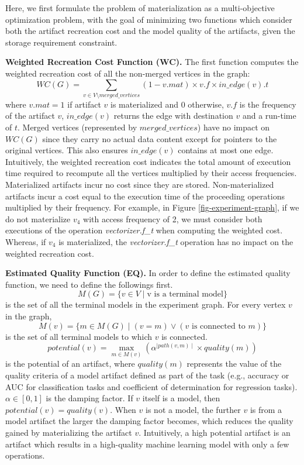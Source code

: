 Here, we first formulate the problem of materialization as a multi-objective optimization problem, with the goal of minimizing two functions which consider both the artifact recreation cost and the model quality of the artifacts, given the storage requirement constraint.

\textbf{Weighted Recreation Cost Function (WC).} 
The first function computes the weighted recreation cost of all the non-merged vertices in the graph:
\[
WC(G) =  \sum\limits_{v \in V\setminus merged\_vertices}  (1-v.mat) \times v.f \times in\_edge(v).t
\]
where $v.mat = 1$ if artifact $v$ is materialized and $0$ otherwise, $v.f$ is the frequency of the artifact $v$, $in\_edge(v)$ returns the edge with destination $v$ and a run-time of $t$.
Merged vertices (represented by $merged\_vertices$) have no impact on $WC(G)$ since they carry no actual data content except for pointers to the original vertices.
This also ensures $in\_edge(v)$ contains at most one edge.
Intuitively, the weighted recreation cost indicates the total amount of execution time required to recompute all the vertices multiplied by their access frequencies.
Materialized artifacts incur no cost since they are stored.
Non-materialized artifacts incur a cost equal to the execution time of the proceeding operations multiplied by their frequency.
For example, in Figure \ref{fig-experiment-graph}, if we do not materialize $v_4$ with access frequency of 2, we must consider both executions of the operation \textit{vectorizer.f\_t}  when computing the weighted cost.
Whereas, if $v_4$ is materialized, the \textit{vectorizer.f\_t} operation has no impact on the weighted recreation cost.

\textbf{Estimated Quality Function (EQ).} 
In order to define the estimated quality function, we need to define the followings first.
\[
M(G) = \{v \in V \mid \text{v is a terminal model}\}
\]
is the set of all the terminal models in the experiment graph.
For every vertex $v$ in the graph, 
\[
M(v) = \{m \in M(G) \mid (v = m) \vee (v \text{ is connected to } m)\}
\]
is the set of all terminal models to which $v$ is connected.
\[
potential(v) = \max\limits_{m \in M(v)} ( \alpha ^ {\mid path(v,m) \mid} \times quality(m) )
\]
is the potential of an artifact, where $quality(m)$ represents the value of the quality criteria of a model artifact defined as part of the task (e.g., accuracy or AUC for classification tasks and coefficient of determination for regression tasks).
$\alpha \in [0,1]$ is the damping factor.
If $v$ itself is a model, then $potential(v) = quality(v)$.
When $v$ is not a model, the further $v$ is from a model artifact the larger the damping factor becomes, which reduces the quality gained by materializing the artifact $v$.
Intuitively, a high potential artifact is an artifact which results in a high-quality machine learning model with only a few operations.


